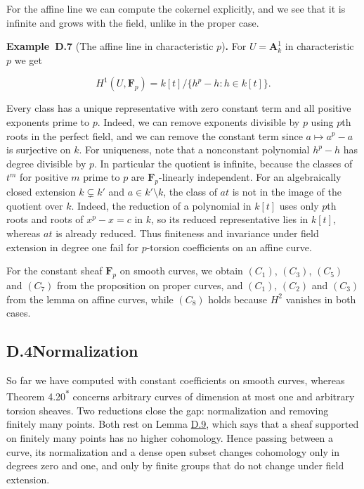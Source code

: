 \documentclass[11pt]{article}
\newenvironment{bpstatement}[2]{\par\addvspace{0.6\baselineskip}\noindent\textbf{#1}#2\textbf{.}\enspace\ignorespaces}
  {\par\addvspace{0.4\baselineskip}}
\newcommand{\bpout}[1]{#1\textsuperscript{\hyperlink{bp-outside}{\ensuremath{\ast}}}}
\begin{document}
\label{bp23}%
For the affine line we can compute the cokernel explicitly, and we see that it is infinite and grows with the field, unlike in the proper case.

\label{bp24}%
\begin{bpstatement}{Example~D.7}{ (The affine line in characteristic $p$)}
For \(U=\mathbf A^1_k\) in characteristic \(p\) we get

\[
H^1(U,\mathbf F_p)=k[t]/\{h^p-h:h\in k[t]\}.
\]

Every class has a unique representative with zero constant term and all positive exponents prime to \(p\).  Indeed, we can remove exponents divisible by \(p\) using \(p\)th roots in the perfect field, and we can remove the constant term since \(a\mapsto a^p-a\) is surjective on \(k\). For uniqueness, note that a nonconstant polynomial \(h^p-h\) has degree divisible by \(p\).  In particular the quotient is infinite, because the classes of \(t^m\) for positive \(m\) prime to \(p\) are \(\mathbf F_p\)-linearly independent.  For an algebraically closed extension \(k\subsetneq k'\) and \(a\in k'\setminus k\), the class of \(at\) is not in the image of the quotient over \(k\). Indeed, the reduction of a polynomial in \(k[t]\) uses only \(p\)th roots and roots of \(x^p-x=c\) in \(k\), so its reduced representative lies in \(k[t]\), whereas \(at\) is already reduced. Thus finiteness and invariance under field extension in degree one fail for \(p\)-torsion coefficients on an affine curve.
\end{bpstatement}

\label{bp25}%
For the constant sheaf \(\mathbf F_p\) on smooth curves, we obtain \((C_1)\), \((C_3)\), \((C_5)\) and \((C_7)\) from the proposition on proper curves, and \((C_1)\), \((C_2)\) and \((C_3)\) from the lemma on affine curves, while \((C_8)\) holds because \(H^2\) vanishes in both cases.


\subsection*{\texorpdfstring{D.4\quad Normalization}{D.4 Normalization}}
\label{bp26}%
\label{bp27}%
So far we have computed with constant coefficients on smooth curves, whereas Theorem \bpout{4.20} concerns arbitrary curves of dimension at most one and arbitrary torsion sheaves. Two reductions close the gap: normalization and removing finitely many points. Both rest on Lemma \hyperref[bp31]{D.9}, which says that a sheaf supported on finitely many points has no higher cohomology. Hence passing between a curve, its normalization and a dense open subset changes cohomology only in degrees zero and one, and only by finite groups that do not change under field extension.
\end{document}

